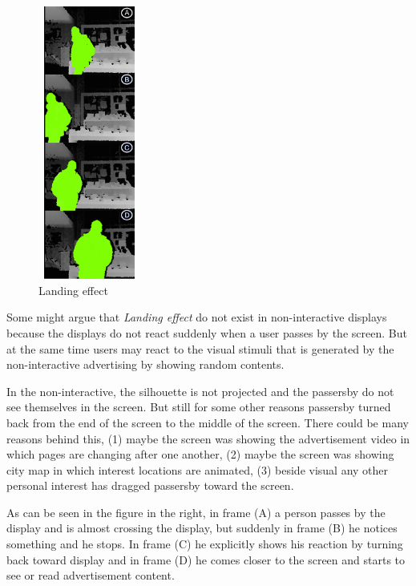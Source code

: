 \begin{figure}
  \vspace{-20pt}
  \begin{center}
    \includegraphics[width=0.30\textwidth,height=90mm]{figures/8/non_inter_findings/effects/landing}
  \end{center}
  \vspace{-20pt}
  \caption{Landing effect}
  \vspace{20pt}
\end{figure}
Some might argue that \emph{Landing effect}\cite{EnticingPeople} do not exist in non-interactive displays because the displays do not react suddenly when a user passes by the screen. But at the same time users may react to the visual stimuli that is generated by the non-interactive advertising by showing random contents.

In the non-interactive, the silhouette is not projected and the passersby do not see themselves in the screen. But still for some other reasons passersby turned back from the end of the screen to the middle of the screen. There could be many reasons behind this, (1) maybe the screen was showing the advertisement video in which pages are changing after one another, (2) maybe the screen was showing city map in which interest locations are animated, (3) beside visual any other personal interest has dragged passersby toward the screen. 

As can be seen in the figure in the right, in frame (A) a person passes by the display and is almost crossing the display, but suddenly in frame (B) he notices something and he stops. In frame (C) he explicitly shows his reaction by turning back toward display and in frame (D) he comes closer to the screen and starts to see or read advertisement content. \\


